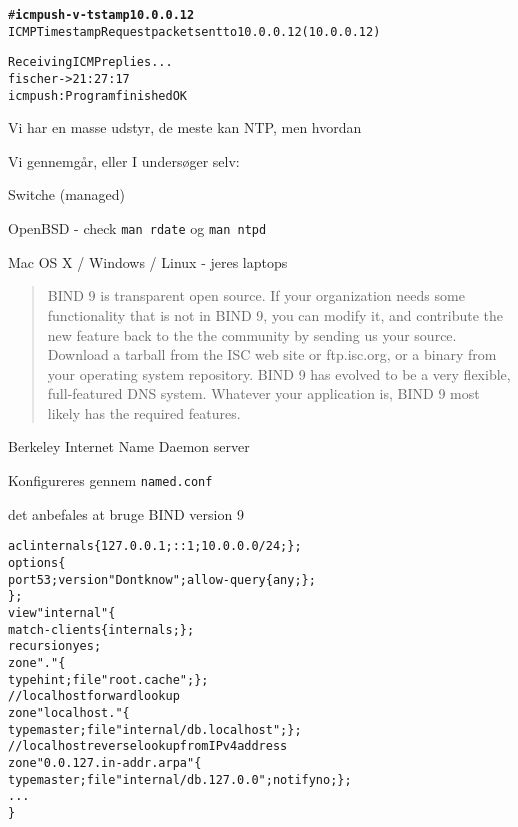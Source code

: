 \documentclass[Screen16to9,17pt]{foils}
\begin{document}
\begin{alltt}
# {\bfseries icmpush -v -tstamp 10.0.0.12}
ICMP Timestamp Request packet sent to 10.0.0.12 (10.0.0.12)

Receiving ICMP replies ...
fischer         -> 21:27:17
icmpush: Program finished OK
\end{alltt}



\begin{list1}
\item Vi har en masse udstyr, de meste kan NTP, men hvordan
\item Vi gennemgår, eller I undersøger selv:
\begin{list2}
\item Switche (managed)
\item OpenBSD - check \verb+man rdate+ og \verb+man ntpd+
\item Mac OS X / Windows / Linux - jeres laptops
\end{list2}
\end{list1}






\begin{quote}
BIND 9 is transparent open source. If your organization needs some functionality that is not in BIND 9, you can modify it, and contribute the new feature back to the the community by sending us your source. Download a tarball from the ISC web site or ftp.isc.org, or a binary from your operating system repository.
BIND 9 has evolved to be a very flexible, full-featured DNS system. Whatever your application is, BIND 9 most likely has the required features.\\
\end{quote}

\begin{list1}
\item Berkeley Internet Name Daemon server
\item Konfigureres gennem \verb+named.conf+
\item det anbefales at bruge BIND version 9
\end{list1}


\begin{alltt}\small
acl internals \{ 127.0.0.1; ::1; 10.0.0.0/24; \};
options \{
        port 53; version "Dont know"; allow-query \{ any; \};
\};
view "internal" \{
   match-clients \{ internals; \};
   recursion yes;
   zone "." \{
       type hint;   file "root.cache"; \};
   // localhost forward lookup
   zone "localhost." \{
        type master; file "internal/db.localhost";   \};
   // localhost reverse lookup from IPv4 address
   zone "0.0.127.in-addr.arpa" \{
        type master; file "internal/db.127.0.0"; notify no;   \};
...
\}
\end{alltt}
\end{document}

